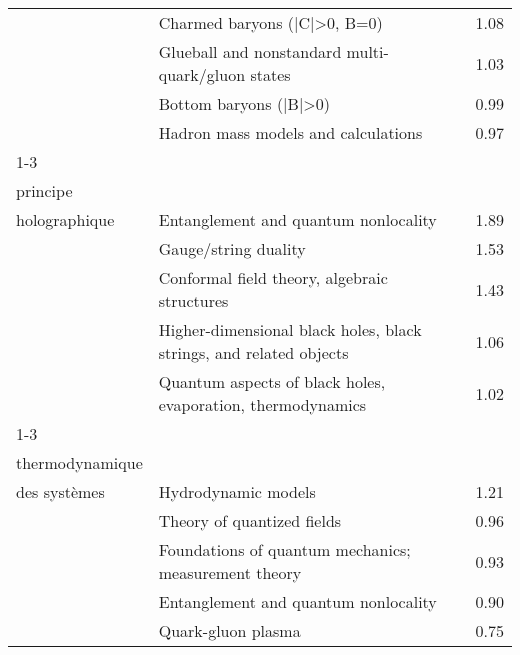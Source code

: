 \begin{longtable}[H]{p{}|p{}|p{}}
                                                                               & Charmed baryons (|C|>0, B=0) &  1.08 \\
                                                                               & Glueball and nonstandard multi-quark/gluon states &  1.03 \\
                                                                               & Bottom baryons (|B|>0) &  0.99 \\
                                                                               & Hadron mass models and calculations &  0.97 \\
\cline{1-3}
\multirow{5}{*}{\begin{tabular}{l}Dualités et\\ principe\\ holographique\end{tabular}} & Entanglement and quantum nonlocality &  1.89 \\
                                                                               & Gauge/string duality &  1.53 \\
                                                                               & Conformal field theory, algebraic structures &  1.43 \\
                                                                               & Higher-dimensional black holes, black strings, and related objects &  1.06 \\
                                                                               & Quantum aspects of black holes, evaporation, thermodynamics &  1.02 \\
\cline{1-3}
\multirow{5}{*}{\begin{tabular}{l}Dynamique et\\ thermodynamique\\ des systèmes\end{tabular}} & Hydrodynamic models &  1.21 \\
                                                                               & Theory of quantized fields &  0.96 \\
                                                                               & Foundations of quantum mechanics; measurement theory &  0.93 \\
                                                                               & Entanglement and quantum nonlocality &  0.90 \\
                                                                               & Quark-gluon plasma &  0.75 \\

\end{longtable}

